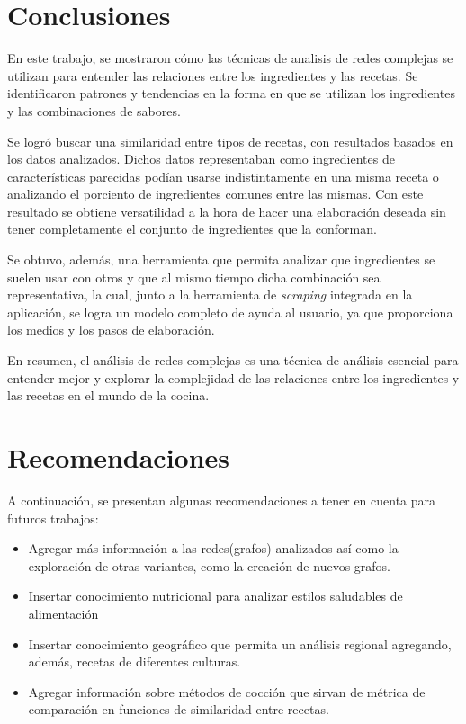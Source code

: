 \documentclass[a4paper]{article}
\begin{document}
\section{Conclusiones}\label{sec:conc}

En este trabajo, se mostraron cómo las técnicas de analisis de redes complejas
se utilizan para entender las relaciones entre los ingredientes y las recetas.
Se identificaron patrones y tendencias en la forma en que se utilizan los
ingredientes y las combinaciones de sabores.

Se logró buscar una similaridad entre tipos de recetas, con resultados
basados en los datos analizados. Dichos datos representaban como ingredientes de
características parecidas podían usarse indistintamente en una misma receta o
analizando el porciento de ingredientes comunes entre las mismas. Con este
resultado se obtiene versatilidad a la hora de hacer una elaboración deseada sin
tener completamente el conjunto de ingredientes que la conforman.

Se obtuvo, además, una herramienta que permita analizar que ingredientes se
suelen usar con otros y que al mismo tiempo dicha combinación sea representativa,
la cual, junto a la herramienta de \emph{scraping} integrada en la aplicación,
se logra un modelo completo de ayuda al usuario, ya que proporciona los medios
y los pasos de elaboración.

En resumen, el análisis de redes complejas es una técnica de análisis esencial
para entender mejor y explorar la complejidad de las relaciones entre los
ingredientes y las recetas en el mundo de la cocina.


\section{Recomendaciones}\label{sec:rec}

A continuación, se presentan algunas recomendaciones a tener en cuenta para
futuros trabajos:
\begin{itemize}
	\item Agregar más información a las redes(grafos) analizados así como la
	exploración de otras variantes, como la creación de nuevos grafos.
	\item Insertar conocimiento nutricional para analizar estilos saludables de
	alimentación
	\item Insertar conocimiento geográfico que permita un análisis regional
	agregando, además, recetas de diferentes culturas.
	\item Agregar información sobre métodos de cocción que sirvan de métrica de
	comparación en funciones de similaridad entre recetas.
\end{itemize}
\end{document}
